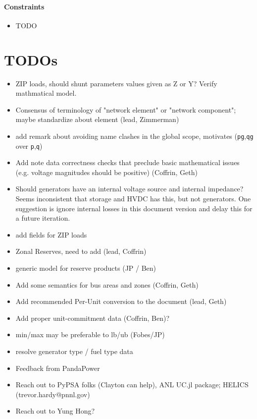 \documentclass{article}
\begin{document}
\paragraph{Constraints}
\begin{itemize}
    \item TODO
\end{itemize}



\clearpage
\section{TODOs}

\begin{itemize}
    \item ZIP loads, should shunt parameters values given as Z or Y?  Verify mathmatical model. 
    \item Consensus of terminology of "network element" or "network component"; maybe standardize about element (lead, Zimmerman)
    \item add remark about avoiding name clashes in the global scope, motivates (\texttt{pg},\texttt{qg} over \texttt{p},\texttt{q}) 
    \item Add note data correctness checks that preclude basic mathematical issues (e.g. voltage magnitudes should be positive) (Coffrin, Geth)
    \item Should generators have an internal voltage source and internal impedance?  Seems inconsistent that storage and HVDC has this, but not generators.  One suggestion is ignore internal losses in this document version and delay this for a future iteration. 
    \item add fields for ZIP loads
    \item Zonal Reserves, need to add  (lead, Coffrin)  
    \item generic model for reserve products (JP / Ben)
    \item Add some semantics for bus areas and zones (Coffrin, Geth)
    \item Add recommended Per-Unit conversion to the document (lead, Geth)
    \item Add proper unit-commitment data (Coffrin, Ben)?
    \item min/max may be preferable to lb/ub (Fobes/JP)
    \item resolve generator type / fuel type data
    \item Feedback from PandaPower
    \item Reach out to PyPSA folks (Clayton can help), ANL UC.jl package; HELICS (trevor.hardy@pnnl.gov)
    \item Reach out to Yung Hong?
\end{itemize}
\end{document}
